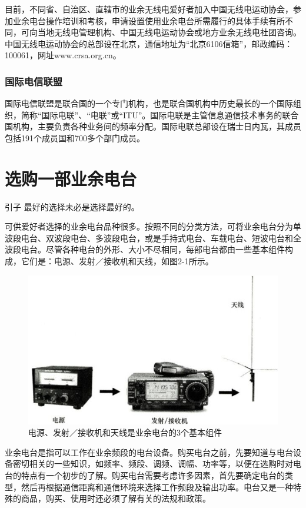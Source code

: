 \documentclass[12pt,UTF8]{ctexbook}
\begin{document}
目前，不同省、自治区、直辖市的业余无线电爱好者加入中国无线电运动协会，参加业余电台操作培训和考核，申请设置使用业余电台所需履行的具体手续有所不同，可向当地无线电管理机构、中国无线电运动协会或地方业余无线电社团咨询。中国无线电运动协会的总部设在北京，通信地址为“北京6106信箱”，邮政编码：100061，网址www.crsa.org.cn。

\subsection{国际电信联盟}

国际电信联盟是联合国的一个专门机构，也是联合国机构中历史最长的一个国际组织，简称“国际电联”、“电联”或“ITU”。国际电联是主管信息通信技术事务的联合国机构，主要负责各种业务间的频率分配。国际电联总部设在瑞士日内瓦，其成员包括191个成员国和700多个部门成员。

\chapter{选购一部业余电台}

引子
最好的选择未必是选择最好的。

可供爱好者选择的业余电台品种很多。按照不同的分类方法，可将业余电台分为单波段电台、双波段电台、多波段电台，或是手持式电台、车载电台、短波电台和全波段电台。尽管各种电台的外形、大小不尽相同，每部电台都由一些基本组件构成，它们是：电源、发射／接收机和天线，如图2-1所示。

\begin{figure}[htbp]
	\centering
	\includegraphics[width=0.7\linewidth]{16}
	\caption{电源、发射／接收机和天线是业余电台的3个基本组件}
	\label{fig:1}
\end{figure}

业余电台是指可以工作在业余频段的电台设备。购买电台之前，先要知道与电台设备密切相关的一些知识，如频率、频段、调频、调幅、功率等，以便在选购时对电台的特点有一个初步的了解。购买电台需要考虑许多因素，首先要确定电台的类型，然后再根据通信距离和通信环境来选择工作频段及输出功率。电台又是一种特殊的商品，购买、使用时还必须了解有关的法规和政策。
\end{document}

